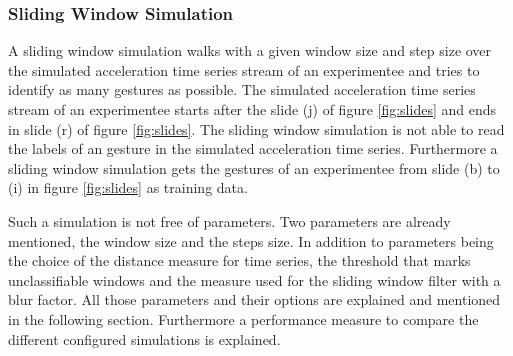 \subsubsection{Sliding Window Simulation} \label{sliding_window_simulation}
A sliding window simulation walks with a given window size and step size over the simulated acceleration time series
stream of an experimentee and tries to identify as many gestures as possible. The simulated acceleration time series
stream of an experimentee starts after the slide (j) of figure \ref{fig:slides} and ends in slide (r) of figure
\ref{fig:slides}. The sliding window simulation is not able to read the labels of an gesture in the simulated
acceleration time series. Furthermore a sliding window simulation gets the gestures of an experimentee from slide (b)
to (i) in figure \ref{fig:slides} as training data.

Such a simulation is not free of parameters. Two parameters are already mentioned, the window size and the steps
size. In addition to parameters being the choice of the distance measure for time series, the threshold that marks
unclassifiable windows and the measure used for the sliding window filter with a blur factor. All those parameters and
their options are explained and mentioned in the following section. Furthermore a performance measure to compare the
different configured simulations is explained.







